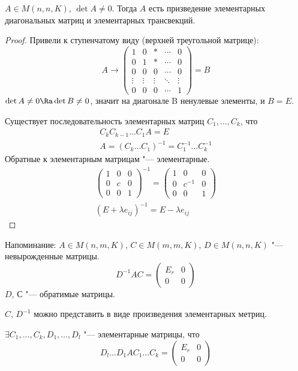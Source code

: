 \begin{theorem}
	$A \in M(n, n, K)$, $\det A \ne 0$.
	Тогда $A$ есть призведение элементарных диагональных матриц и элементарных трансвекций.
\end{theorem}
\begin{proof}
	Привели к ступенчатому виду (верхней треугольной матрице):
	\[
		A \to \begin{pmatrix}
			1 & 0 & * &\cdots& 0 \\
			0 & 1 & * &\cdots& 0 \\
			0 & 0 & 0 &\cdots& 0 \\
			\vdots&\vdots&\vdots&\ddots&\vdots\\
			0 & 0 & 0 &\cdots& 1
		\end{pmatrix} = B
	\]
	$\det A \ne 0 \Ra \det B \ne 0$, значит на диагонале B ненулевые элементы, и $B = E$.

	Существует последовательность элементарных матриц $C_1, \dots, C_k$, что
	\begin{gather*}
		C_k C_{k-1} \dots C_1 A = E \\
		A = (C_k \dots C_1)^{-1} = C_1^{-1} \dots C_k^{-1} 
	\end{gather*}
	Обратные к элементарным матрицам "--- элементарные.
	\begin{gather*}
		\begin{pmatrix}
			1 & 0 & 0 \\
			0 & c & 0 \\
			0 & 0 & 1
		\end{pmatrix}^{-1} = \begin{pmatrix}
			1 & 0 & 0 \\
			0 & c^{-1} & 0 \\
			0 & 0 & 1
		\end{pmatrix} \\
		(E + \lambda e_{ij})^{-1} = E - \lambda e_{ij}
	\end{gather*}
\end{proof}

Напоминание: $A \in M(n, m, K)$, $C \in M(m, m, K)$, $D \in M(n, n, K)$ "--- невырожденные матрицы.
\[
	D^{-1}AC = \begin{pmatrix}
		E_r & 0 \\
		0   & 0
	\end{pmatrix}
\]
$D$, $С$ "--- обратимые матрицы.

$C$, $D^{-1}$ можно представить в виде произведения элементарных метриц.
\begin{conseq}
	$\exists C_1, \dots, C_k, D_1, \dots, D_l$ "--- элементарные матрицы, что
	\[
		D_l \dots D_1 A C_1 \dots C_k = \begin{pmatrix}
			E_r & 0 \\
			0   & 0
		\end{pmatrix}
	\]
\end{conseq}

